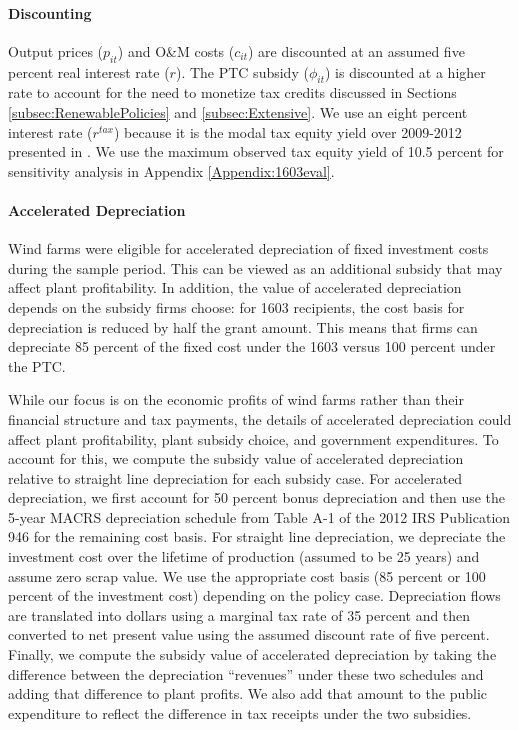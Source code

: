 \documentclass[12pt]{article}
\begin{document}
\paragraph*{Discounting}
Output prices ($p_{it}$) and O\&M costs ($c_{it}$) are discounted at an assumed five percent real interest rate ($r$). The PTC subsidy ($\phi_{it}$) is discounted at a higher rate to account for the need to monetize tax credits discussed in Sections \ref{subsec:RenewablePolicies} and \ref{subsec:Extensive}. We use an eight percent interest rate ($r^{tax}$) because it is the modal tax equity yield over 2009-2012 presented in \citet{bolinger_analysis_2014}. We use the maximum observed tax equity yield of 10.5 percent for sensitivity analysis in Appendix \ref{Appendix:1603eval}.

\paragraph*{Accelerated Depreciation}
Wind farms were eligible for accelerated depreciation of fixed investment costs during the sample period. This can be viewed as an additional subsidy that may affect plant profitability. In addition, the value of accelerated depreciation depends on the subsidy firms choose: for 1603 recipients, the cost basis for depreciation is reduced by half the grant amount. This means that firms can depreciate 85 percent of the fixed cost under the 1603 versus 100 percent under the PTC.

While our focus is on the economic profits of wind farms rather than their financial structure and tax payments, the details of accelerated depreciation could affect plant profitability, plant subsidy choice, and government expenditures. To account for this, we compute the subsidy value of accelerated depreciation relative to straight line depreciation for each subsidy case. For accelerated depreciation, we first account for 50 percent bonus depreciation and then use the 5-year MACRS depreciation schedule from Table A-1 of the 2012 IRS Publication 946 for the remaining cost basis. For straight line depreciation, we depreciate the investment cost over the lifetime of production (assumed to be 25 years) and assume zero scrap value. We use the appropriate cost basis (85 percent or 100 percent of the investment cost) depending on the policy case. Depreciation flows are translated into dollars using a marginal tax rate of 35 percent and then converted to net present value using the assumed discount rate of five percent. Finally, we compute the subsidy value of accelerated depreciation by taking the difference between the depreciation ``revenues'' under these two schedules and adding that difference to plant profits. We also add that amount to the public expenditure to reflect the difference in tax receipts under the two subsidies.
\end{document}

